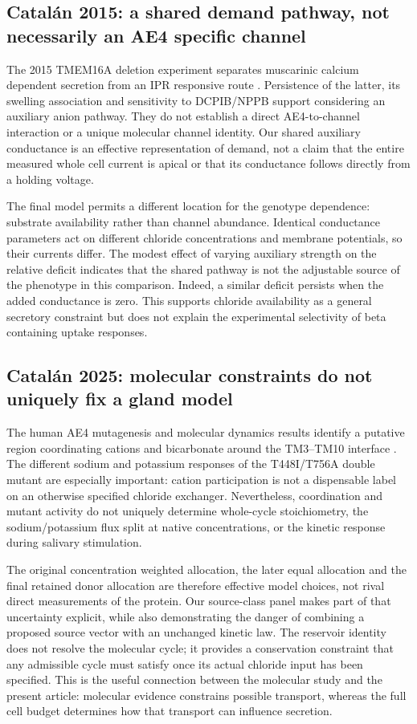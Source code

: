 \documentclass[11pt]{article}
\begin{document}
\subsection{Catalán 2015: a shared demand pathway, not necessarily an AE4 specific channel}

The 2015 TMEM16A deletion experiment separates muscarinic calcium dependent secretion from an IPR responsive route \citep{Catalan2015}. Persistence of the latter, its swelling association and sensitivity to DCPIB/NPPB support considering an auxiliary anion pathway. They do not establish a direct AE4-to-channel interaction or a unique molecular channel identity. Our shared auxiliary conductance is an effective representation of demand, not a claim that the entire measured whole cell current is apical or that its conductance follows directly from a holding voltage.

The final model permits a different location for the genotype dependence: substrate availability rather than channel abundance. Identical conductance parameters act on different chloride concentrations and membrane potentials, so their currents differ. The modest effect of varying auxiliary strength on the relative deficit indicates that the shared pathway is not the adjustable source of the phenotype in this comparison. Indeed, a similar deficit persists when the added conductance is zero. This supports chloride availability as a general secretory constraint but does not explain the experimental selectivity of beta containing uptake responses.

\subsection{Catalán 2025: molecular constraints do not uniquely fix a gland model}

The human AE4 mutagenesis and molecular dynamics results identify a putative region coordinating cations and bicarbonate around the TM3--TM10 interface \citep{Catalan2025}. The different sodium and potassium responses of the T448I/T756A double mutant are especially important: cation participation is not a dispensable label on an otherwise specified chloride exchanger. Nevertheless, coordination and mutant activity do not uniquely determine whole-cycle stoichiometry, the sodium/potassium flux split at native concentrations, or the kinetic response during salivary stimulation.

The original concentration weighted allocation, the later equal allocation and the final retained donor allocation are therefore effective model choices, not rival direct measurements of the protein. Our source-class panel makes part of that uncertainty explicit, while also demonstrating the danger of combining a proposed source vector with an unchanged kinetic law. The reservoir identity does not resolve the molecular cycle; it provides a conservation constraint that any admissible cycle must satisfy once its actual chloride input has been specified. This is the useful connection between the molecular study and the present article: molecular evidence constrains possible transport, whereas the full cell budget determines how that transport can influence secretion.
\end{document}

